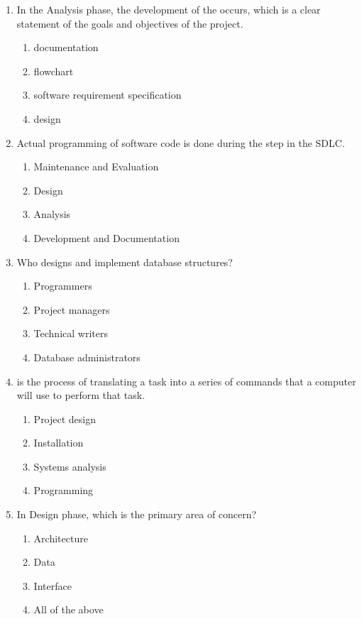 \documentclass[12pt]{article}
\newcommand{\answeritem}{\global\answertrue\item}
\newcommand{\perhapsanswer}{%
  \ifanswer
    $\blacksquare$ \global\answerfalse
  \else
    $\square$ \global\answerfalse
  \fi
}
\newif\ifanswer
\begin{document}
\begin{enumerate}
    \item In the Analysis phase, the development of the \underline{\phantom{Neither of the above}} occurs, which is a clear statement of the goals and objectives of the project.
    \begin{enumerate}[start=1,align=left,label={\protect\perhapsanswer(\alph*)}]
      \item documentation
      \item flowchart
      \answeritem software requirement specification
      \item design
    \end{enumerate}

    \item Actual programming of software code is done during the \underline{\phantom{Neither of the above}} step in the SDLC.
    \begin{enumerate}[start=1,align=left,label={\protect\perhapsanswer(\alph*)}]
      \item Maintenance and Evaluation
      \item Design
      \item Analysis
      \answeritem Development and Documentation
    \end{enumerate}

    \item Who designs and implement database structures?
    \begin{enumerate}[start=1,align=left,label={\protect\perhapsanswer(\alph*)}]
      \item Programmers
      \item Project managers
      \item Technical writers
      \answeritem Database administrators
    \end{enumerate}

    \item \underline{\phantom{Neither of the above}} is the process of translating a task into a series of commands that a computer will use to perform that task.
    \begin{enumerate}[start=1,align=left,label={\protect\perhapsanswer(\alph*)}]
      \item Project design
      \item Installation
      \item Systems analysis
      \answeritem Programming
    \end{enumerate}

    \item In Design phase, which is the primary area of concern?
    \begin{enumerate}[start=1,align=left,label={\protect\perhapsanswer(\alph*)}]
      \item Architecture
      \item Data
      \item Interface
      \answeritem All of the above
    \end{enumerate}


\end{enumerate}
\end{document}
